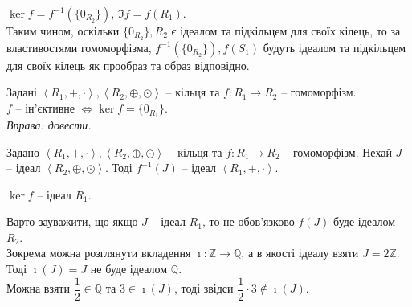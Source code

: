 \documentclass{math_library}
\begin{document}
\begin{remark}
$\ker f = f^{-1}(\{0_{R_2}\})$, \qquad $\Im f = f(R_1)$.\\
Таким чином, оскільки $\{0_{R_2}\}, R_2$ є ідеалом та підкільцем для своїх кілець, то за властивостями гомоморфізма, $f^{-1}(\{0_{R_2}\}), f(S_1)$ будуть ідеалом та підкільцем для своїх кілець як прообраз та образ відповідно.
\end{remark}

\begin{theorem}
Задані $\left<R_1, +, \cdot \right>,\left<R_2, \oplus, \odot \right>$ -- кільця та $f \colon R_1 \to R_2$ -- гомоморфізм.\\
$f$ -- ін'єктивне $\iff \ker f = \{0_{R_1}\}$.\\
\textit{Вправа: довести.}
\end{theorem}

\begin{proposition}
Задано $\left< R_1, +, \cdot \right>,\left<R_2, \oplus, \odot \right>$ -- кільця та $f \colon R_1 \to R_2$ -- гомоморфізм. Нехай $J$ -- ідеал $\left<R_2, \oplus, \odot \right>$. Тоді $f^{-1}(J)$ -- ідеал $\left<R_1,+,\cdot\right>$.
\end{proposition}

\begin{corollary}
$\ker f$ -- ідеал $R_1$.
\end{corollary}

\begin{remark}
Варто зауважити, що якщо $J$ -- ідеал $R_1$, то не обов'язково $f(J)$ буде ідеалом $R_2$.\\
Зокрема можна розглянути вкладення $\imath \colon \mathbb{Z} \to \mathbb{Q}$, а в якості ідеалу взяти $J = 2 \mathbb{Z}$. Тоді $\imath(J) = J$ не буде ідеалом $\mathbb{Q}$.\\
Можна взяти $\dfrac{1}{2} \in \mathbb{Q}$ та $3 \in \imath(J)$, тоді звідси $\dfrac{1}{2} \cdot 3 \notin \imath(J)$.
\end{remark}
\end{document}
